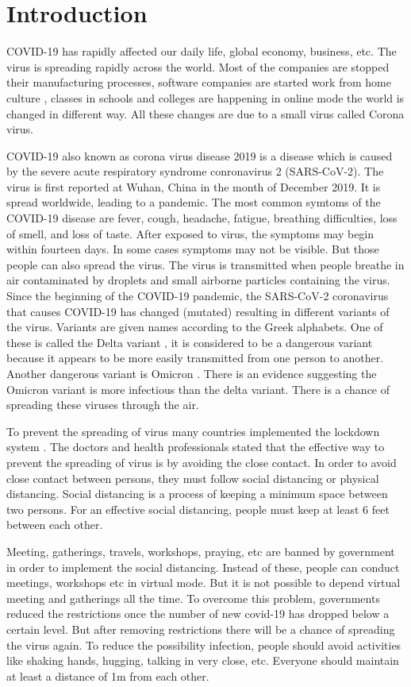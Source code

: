 \documentclass[conference]{IEEEtran}
\begin{document}
\section{Introduction}
COVID-19 has rapidly affected our daily life, global economy, business, etc. The virus is spreading rapidly across the world. Most of the companies are stopped their manufacturing processes, software companies are started work from home culture , classes in schools and colleges are happening in online mode the world is changed in different way. All these changes are due to a small virus called Corona virus. 
\par 
COVID-19 also known as corona virus disease 2019 is a disease which is caused by the severe acute respiratory syndrome conronavirus 2 (SARS-CoV-2). The virus is first reported at Wuhan, China in the month of December 2019. It is spread worldwide, leading to a pandemic. The most common symtoms of the COVID-19 disease are fever, cough, headache, fatigue, breathing difficulties, loss of smell, and loss of taste. After exposed to virus, the symptoms may begin within fourteen days. In some cases symptoms may not be visible. But those people can also spread the virus. The virus is transmitted when people breathe in air contaminated by droplets and small airborne particles containing the virus. Since the beginning of the COVID-19 pandemic, the SARS-CoV-2 coronavirus that causes COVID-19 has changed (mutated) resulting in different variants of the virus. Variants are given names according to the Greek alphabets. One of these is called the Delta variant \cite{delta}, it is considered to be a dangerous variant because it appears to be more easily transmitted from one person to another. Another dangerous variant is Omicron \cite{omicron}. There is an evidence suggesting the Omicron variant is more infectious than the delta variant. There is a chance of spreading these viruses through the air. 
\par 
To prevent the spreading of virus many countries implemented the lockdown system \cite{lockdown}. The doctors and health professionals stated that the effective way to prevent the spreading of virus is by avoiding the close contact. In order to avoid close contact between persons, they must follow social distancing or physical distancing. Social distancing is a process of keeping a minimum space between two persons. For an effective social distancing, people must keep at least 6 feet between each other.
\par 
Meeting, gatherings, travels, workshops, praying, etc are banned by government in order to implement the social distancing. Instead of these, people can conduct meetings, workshops etc in virtual mode. But it is not possible to depend virtual meeting and gatherings all the time. To overcome this problem, governments reduced the restrictions once the number of new covid-19 has dropped below a certain level. But after removing restrictions there will be a chance of spreading the virus again. To reduce the possibility infection, people should avoid activities like shaking hands, hugging, talking in very close, etc. Everyone should maintain at least a distance of 1m from each other.
\end{document}
